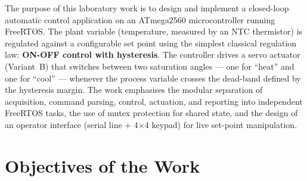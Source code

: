 \documentclass[12pt]{article}
\begin{document}
The purpose of this laboratory work is to design and implement a closed-loop automatic control application on an ATmega2560 microcontroller running FreeRTOS. The plant variable (temperature, measured by an NTC thermistor) is regulated against a configurable set point using the simplest classical regulation law: \textbf{ON-OFF control with hysteresis}. The controller drives a servo actuator (Variant~B) that switches between two saturation angles --- one for \enquote{heat} and one for \enquote{cool} --- whenever the process variable crosses the dead-band defined by the hysteresis margin. The work emphasises the modular separation of acquisition, command parsing, control, actuation, and reporting into independent FreeRTOS tasks, the use of mutex protection for shared state, and the design of an operator interface (serial line + 4$\times$4 keypad) for live set-point manipulation.

\section{Objectives of the Work}
\end{document}

